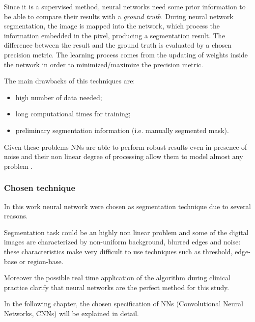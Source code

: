 \documentclass[../main.tex]{subfiles}
\begin{document}
Since it is a supervised method, neural networks need some prior information to be able to compare their results  with a \textit{ground truth}. During neural network segmentation, the image is mapped into the network, which process the information embedded in the pixel, producing a segmentation result. The difference between the result and the ground truth is evaluated by a chosen precision metric. The learning process comes from the updating of weights inside the network in order to minimized/maximize the precision metric.

The main drawbacks of this techniques are: 
\begin{itemize}
    \item high number of data needed;
    \item long computational times for training;
    \item preliminary segmentation information (i.e. manually segmented mask).
\end{itemize}
Given these problems NNs are able to perform robust results even in presence of noise 
and their non linear degree of processing allow them to model almost any problem \cite{kang2009comparative}.



\subsubsection{Chosen technique}

In this work neural network were chosen as segmentation technique due to several reasons.


Segmentation task could be an highly non linear problem and some of the digital images are characterized by non-uniform background, blurred edges and noise: these characteristics make very difficult to use techniques such as threshold, edge-base or region-base.

Moreover the possible real time application of the algorithm during clinical practice clarify that neural networks are the perfect method for this study.

In the following chapter, the chosen specification of NNs (Convolutional Neural Networks, CNNs) will be explained in detail.
\end{document}
